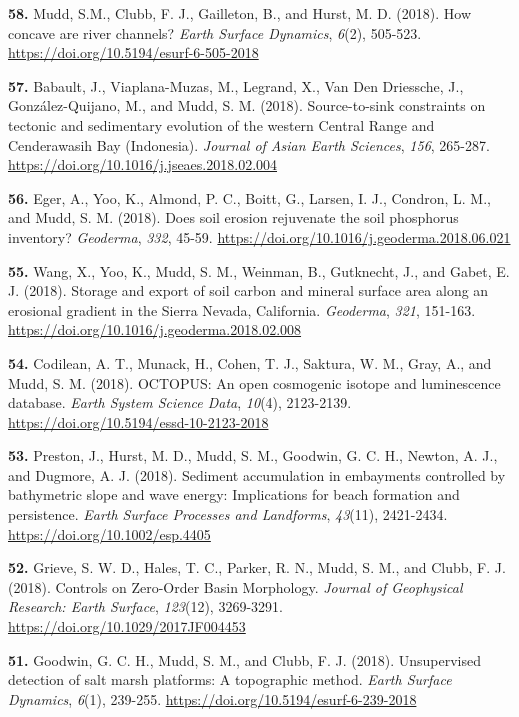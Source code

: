 \documentclass[10pt, a4paper]{article}
\newcommand{\years}[1]{\marginnote{\scriptsize #1}}
\begin{document}
\years{2018}\hangindent=0.7cm\textbf{58. }Mudd, S.M., Clubb, F. J., Gailleton, B., and Hurst, M. D. (2018). How concave are river channels? \textit{Earth Surface Dynamics}, \textit{6}(2), 505-523. \href{https://doi.org/10.5194/esurf-6-505-2018}{https://doi.org/10.5194/esurf-6-505-2018}\par
\years{2018}\hangindent=0.7cm\textbf{57. }Babault, J., Viaplana-Muzas, M., Legrand, X., Van Den Driessche, J., González-Quijano, M., and Mudd, S. M. (2018). Source-to-sink constraints on tectonic and sedimentary evolution of the western Central Range and Cenderawasih Bay (Indonesia). \textit{Journal of Asian Earth Sciences}, \textit{156}, 265-287. \href{https://doi.org/10.1016/j.jseaes.2018.02.004}{https://doi.org/10.1016/j.jseaes.2018.02.004}\par
\years{2018}\hangindent=0.7cm\textbf{56. }Eger, A., Yoo, K., Almond, P. C., Boitt, G., Larsen, I. J., Condron, L. M., and Mudd, S. M. (2018). Does soil erosion rejuvenate the soil phosphorus inventory? \textit{Geoderma}, \textit{332}, 45-59. \href{https://doi.org/10.1016/j.geoderma.2018.06.021}{https://doi.org/10.1016/j.geoderma.2018.06.021}\par
\years{2018}\hangindent=0.7cm\textbf{55. }Wang, X., Yoo, K., Mudd, S. M., Weinman, B., Gutknecht, J., and Gabet, E. J. (2018). Storage and export of soil carbon and mineral surface area along an erosional gradient in the Sierra Nevada, California. \textit{Geoderma}, \textit{321}, 151-163. \href{https://doi.org/10.1016/j.geoderma.2018.02.008}{https://doi.org/10.1016/j.geoderma.2018.02.008}\par
\years{2018}\hangindent=0.7cm\textbf{54. }Codilean, A. T., Munack, H., Cohen, T. J., Saktura, W. M., Gray, A., and Mudd, S. M. (2018). OCTOPUS: An open cosmogenic isotope and luminescence database. \textit{Earth System Science Data}, \textit{10}(4), 2123-2139. \href{https://doi.org/10.5194/essd-10-2123-2018}{https://doi.org/10.5194/essd-10-2123-2018}\par
\years{2018}\hangindent=0.7cm\textbf{53. }Preston, J., Hurst, M. D., Mudd, S. M., Goodwin, G. C. H., Newton, A. J., and Dugmore, A. J. (2018). Sediment accumulation in embayments controlled by bathymetric slope and wave energy: Implications for beach formation and persistence. \textit{Earth Surface Processes and Landforms}, \textit{43}(11), 2421-2434. \href{https://doi.org/10.1002/esp.4405}{https://doi.org/10.1002/esp.4405}\par
\years{2018}\hangindent=0.7cm\textbf{52. }Grieve, S. W. D., Hales, T. C., Parker, R. N., Mudd, S. M., and Clubb, F. J. (2018). Controls on Zero-Order Basin Morphology. \textit{Journal of Geophysical Research: Earth Surface}, \textit{123}(12), 3269-3291. \href{https://doi.org/10.1029/2017JF004453}{https://doi.org/10.1029/2017JF004453}\par
\years{2018}\hangindent=0.7cm\textbf{51. }Goodwin, G. C. H., Mudd, S. M., and Clubb, F. J. (2018). Unsupervised detection of salt marsh platforms: A topographic method. \textit{Earth Surface Dynamics}, \textit{6}(1), 239-255. \href{https://doi.org/10.5194/esurf-6-239-2018}{https://doi.org/10.5194/esurf-6-239-2018}\par
\end{document}
